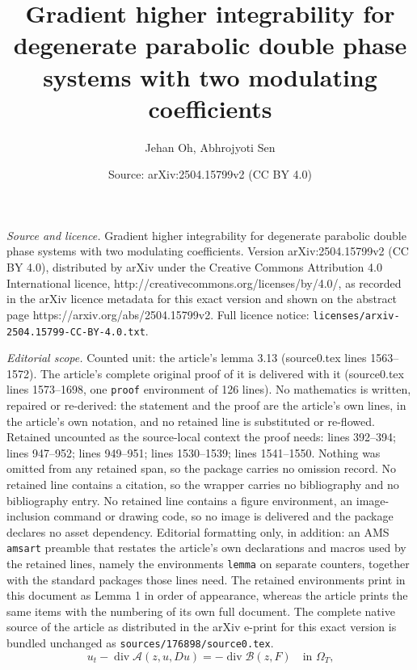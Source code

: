\documentclass[10pt,a4paper]{amsart}
\title{Gradient higher integrability for degenerate parabolic double phase systems with two modulating coefficients}
\author{Jehan Oh, Abhrojyoti Sen}
\date{Source: arXiv:2504.15799v2 (CC BY 4.0)}
\begin{document}
\maketitle

\noindent\emph{Source and licence.} Gradient higher integrability for degenerate parabolic double phase systems with two modulating coefficients. Version arXiv:2504.15799v2 (CC BY 4.0), distributed by arXiv under the Creative Commons Attribution 4.0 International licence, http://creativecommons.org/licenses/by/4.0/, as recorded in the arXiv licence metadata for this exact version and shown on the abstract page https://arxiv.org/abs/2504.15799v2. Full licence notice: \texttt{licenses/arxiv-2504.15799-CC-BY-4.0.txt}.\par\smallskip

\noindent\textit{Editorial scope.} Counted unit: the article's lemma 3.13 (source0.tex lines 1563--1572). The article's complete original proof of it is delivered with it (source0.tex lines 1573--1698, one \texttt{proof} environment of 126 lines). No mathematics is written, repaired or re-derived: the statement and the proof are the article's own lines, in the article's own notation, and no retained line is substituted or re-flowed.  Retained uncounted as the source-local context the proof needs: lines 392--394; lines 947--952; lines 949--951; lines 1530--1539; lines 1541--1550.  Nothing was omitted from any retained span, so the package carries no omission record.  No retained line contains a citation, so the wrapper carries no bibliography and no bibliography entry.  No retained line contains a figure environment, an image-inclusion command or drawing code, so no image is delivered and the package declares no asset dependency.  Editorial formatting only, in addition: an AMS \texttt{amsart} preamble that restates the article's own declarations and macros used by the retained lines, namely the environments \texttt{lemma} on separate counters, together with the standard packages those lines need.  The retained environments print in this document as Lemma 1 in order of appearance, whereas the article prints the same items with the numbering of its own full document.  The complete native source of the article as distributed in the arXiv e-print for this exact version is bundled unchanged as \texttt{sources/176898/source0.tex}.
\begin{equation}    \label{eq: main equation}
    u_t -\operatorname*{div}\mathcal{A}(z,u,Du)=-\operatorname*{div}\mathcal{B}(z,F) \quad \text{in $\Omega_T$,}
\end{equation}
\end{document}
